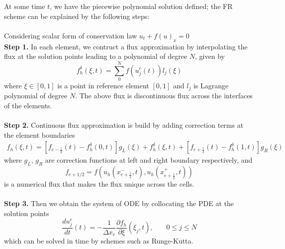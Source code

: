 At some time $t$, we have the piecewise polynomial solution defined; the FR scheme can be explained by the following steps: \\ \\ 
Considering scalar form of conservation law $ u_t + f(u)_x = 0$ \\
\textbf{Step 1.} In each element, we contruct a flux approximation by interpolating the flux at the solution points leading to a polynomial of degree $N$, given by
\begin{equation*}
    f_h^\delta(\xi,t) = \sum_0^Nf(u_j^e(t))l_j(\xi)
\end{equation*}
where $\xi \in [0,1]$ is a point in reference element $[0,1]$
and $l_j$ is Lagrange polynomial of degree $N$. The above flux is discontinuous flux across the interfaces of the elements. \\ \\
\textbf{Step 2.} Continuous flux approximation is build by adding correction terms at the element boundaries
\begin{align*}
    f_h(\xi,t) = \left[ f_{e-\frac{1}{2}}(t)-f_h^\delta(0,t) \right]g_L(\xi)+ f_h^\delta(\xi,t) + \left[ f_{e+\frac{1}{2}}(t)-f_h^\delta(1,t) \right]g_R(\xi)
\end{align*}
where $g_L$, $g_R$ are correction functions at left and right boundary respectively, and 
\begin{equation*}
    f_{e+1/2} = f(u_h(x^-_{e+\frac{1}{2}},t),u_h(x^+_{e+\frac{1}{2}},t))
\end{equation*}
is a numerical flux that makes the flux unique across the cells.\\ \\
\textbf{Step 3.} \label{step3} Then we obtain the system of ODE by collocating the PDE at the solution points
\begin{equation*}
    \frac{du^e_j}{dt}(t) = -\frac{1}{\Delta x_e}\frac{\partial f_h}{\partial \xi}(\xi_j,t), \hspace{22pt} 0 \leq j \leq N
\end{equation*}
which can be solved in time by schemes such as Runge-Kutta.
